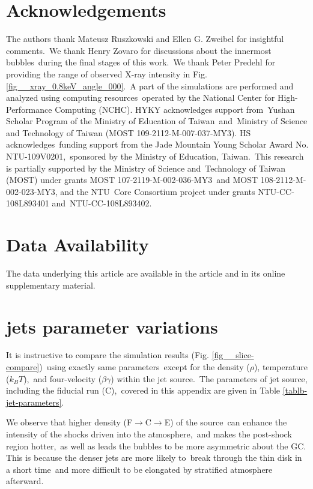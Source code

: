 \documentclass[fleqn,usenatbib,useAMS]{mnras}
\begin{document}
\section{Acknowledgements}
The authors thank Mateusz Ruszkowski and Ellen G. Zweibel for insightful comments.\
We thank Henry Zovaro for discussions about the innermost bubbles\
during the final stages of this work.\
We thank Peter Predehl for providing the range of observed X-ray intensity in Fig. \ref{fig__xray_0.8keV_angle_000}.\
A part of the simulations are performed and analyzed using computing resources\
operated by the National Center for High-Performance Computing (NCHC).
HYKY acknowledges support from\
Yushan Scholar Program of the Ministry of Education of Taiwan\
and\
Ministry of Science and Technology of Taiwan (MOST 109-2112-M-007-037-MY3).
HS acknowledges\
funding support from the Jade Mountain Young Scholar Award No. NTU-109V0201,\
sponsored by the Ministry of Education, Taiwan.\
This research is partially supported by the Ministry of Science and\
Technology of Taiwan (MOST) under grants MOST 107-2119-M-002-036-MY3\
and MOST 108-2112-M-002-023-MY3, and the NTU\
Core Consortium project under grants NTU-CC-108L893401 and\
NTU-CC-108L893402.

\section*{Data Availability}
The data underlying this article are available in the article and in its online supplementary material.






\appendix
\section{jets parameter variations}

It is instructive to compare the simulation results (Fig. \ref{fig__slice-compare})\
using exactly same parameters\
except for the density ($\rho$), temperature ($k_{B}T$),\
and four-velocity ($\beta\gamma$) within the jet source.\
The parameters of jet source, including the fiducial run (C),\
covered in this appendix are given in Table \ref{tablb-jet-parameters}.

We observe that higher density (F$\rightarrow$C$\rightarrow$E) of the source\
can enhance the intensity of the shocks driven into the atmosphere,\
and makes the post-shock region hotter,\
as well as leads the bubbles to be more asymmetric about the GC.
This is because the denser jets are more likely to\
break through the thin disk in a short time\
and more difficult to be elongated by stratified atmosphere afterward.
\end{document}
